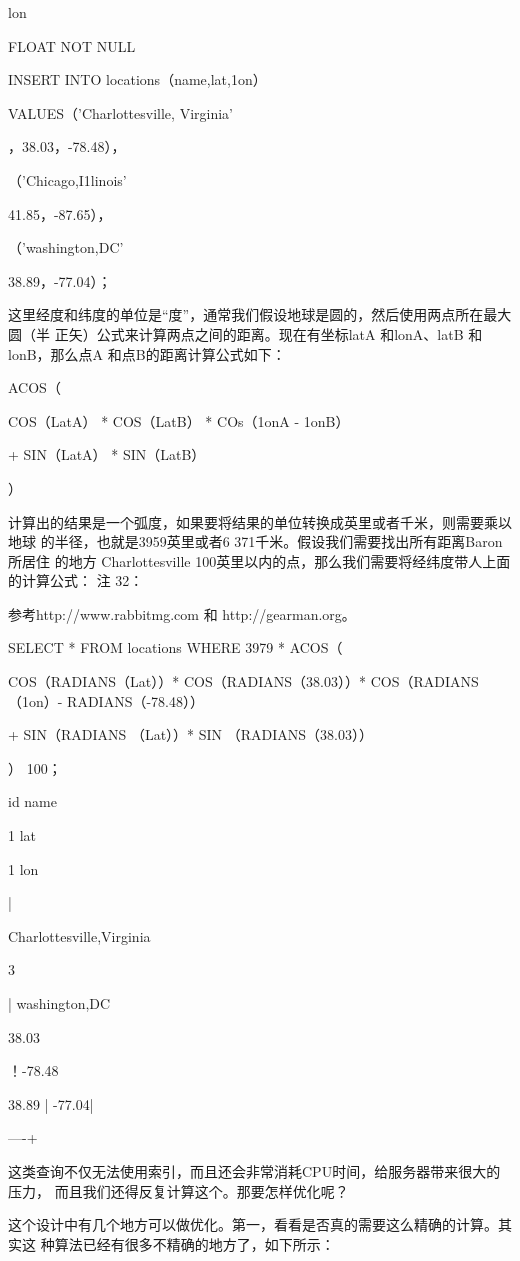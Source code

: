 lon

FLOAT NOT NULL

INSERT INTO locations（name,lat,1on）

VALUES（'Charlottesville, Virginia'

，38.03，-78.48），

（'Chicago,I1linois'

41.85，-87.65），

（'washington,DC'

38.89，-77.04）；

这里经度和纬度的单位是“度”，通常我们假设地球是圆的，然后使用两点所在最大圆（半
正矢）公式来计算两点之间的距离。现在有坐标latA 和lonA、latB 和lonB，那么点A
和点B的距离计算公式如下：

ACOS（

COS（LatA） * COS（LatB） * COs（1onA - 1onB）

+ SIN（LatA） * SIN（LatB）

）

计算出的结果是一个弧度，如果要将结果的单位转换成英里或者千米，则需要乘以地球
的半径，也就是3959英里或者6 371千米。假设我们需要找出所有距离Baron 所居住
的地方 Charlottesville 100英里以内的点，那么我们需要将经纬度带人上面的计算公式：
注 32：

参考http://www.rabbitmg.com 和 http://gearman.org。

SELECT * FROM locations WHERE 3979 * ACOS（

COS（RADIANS（Lat））* COS（RADIANS（38.03））* COS（RADIANS（1on）- RADIANS（-78.48））

+ SIN（RADIANS （Lat））* SIN （RADIANS（38.03））

） 100；

id name

1 lat

1 lon

|

Charlottesville,Virginia

3

| washington,DC

38.03

！-78.48

38.89 | -77.04|

----+

这类查询不仅无法使用索引，而且还会非常消耗CPU时间，给服务器带来很大的压力，
而且我们还得反复计算这个。那要怎样优化呢？

这个设计中有几个地方可以做优化。第一，看看是否真的需要这么精确的计算。其实这
种算法已经有很多不精确的地方了，如下所示：

